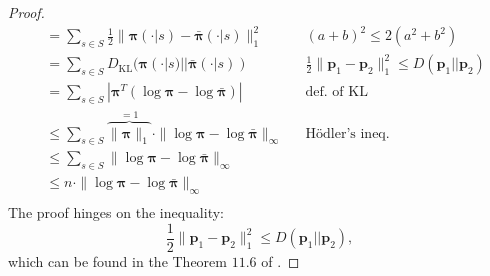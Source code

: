 \begin{claim}
\begin{proof}
\begin{align*}
            & = \sum_{s\in S} \frac{1}{2} \| \bm{\pi} (\cdot|s) 
            - \bar{\bm{\pi}} (\cdot|s) \|_1^2 
            && (a+b)^2 \leq 2(a^2+b^2) \\
            & = \sum_{s\in S} D_\text{KL}( \bm{\pi} (\cdot|s) 
            || \bar{\bm{\pi}} (\cdot|s) )
            && \frac{1}{2} \|\bm{p}_1 - \bm{p}_2 \|_1^2 \leq D(\bm{p}_1||\bm{p}_2) \\
            & = \sum_{s\in S} | \bm{\pi}^T (  \log \bm{\pi} - \log \bar{\bm{\pi}} )  |
            && \text{def. of KL}\\
            & \leq \sum_{s\in S} 
            \overbrace{\| \bm{\pi} \|_1 }^{=1}
            \cdot \|  \log \bm{\pi} - \log \bar{\bm{\pi}} \|_\infty  
            && \text{Hödler's ineq.}\\
            & \leq \sum_{s\in S} 
             \|  \log \bm{\pi} - \log \bar{\bm{\pi}} \|_\infty  
            && \\
            & \leq 
            n \cdot
             \|  \log \bm{\pi} - \log \bar{\bm{\pi}} \|_\infty  
            && \\
        \end{align*}
        The proof hinges on the inequality:
        \[ \frac{1}{2} \|\bm{p}_1 - \bm{p}_2 \|_1^2 \leq D(\bm{p}_1||\bm{p}_2), \]
        which can be found in the Theorem $11.6$ of \cite{Cover2006}.
    \end{proof}
\end{claim}

